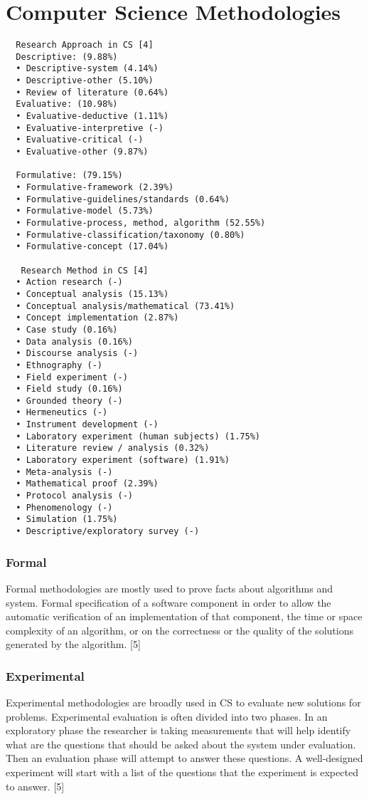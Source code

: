 \section{Computer Science Methodologies}

\begin{verbatim}
  Research Approach in CS [4]
  Descriptive: (9.88%)
  •	Descriptive-system (4.14%)
  •	Descriptive-other (5.10%)
  •	Review of literature (0.64%)
  Evaluative: (10.98%)
  •	Evaluative-deductive (1.11%)
  •	Evaluative-interpretive (-)
  •	Evaluative-critical (-)
  •	Evaluative-other (9.87%)

  Formulative: (79.15%)
  •	Formulative-framework (2.39%)
  •	Formulative-guidelines/standards (0.64%)
  •	Formulative-model (5.73%)
  •	Formulative-process, method, algorithm (52.55%)
  •	Formulative-classification/taxonomy (0.80%)
  •	Formulative-concept (17.04%)

   Research Method in CS [4]
  •	Action research (-)
  •	Conceptual analysis (15.13%)
  •	Conceptual analysis/mathematical (73.41%)
  •	Concept implementation (2.87%)
  •	Case study (0.16%)
  •	Data analysis (0.16%)
  •	Discourse analysis (-)
  •	Ethnography (-)
  •	Field experiment (-)
  •	Field study (0.16%)
  •	Grounded theory (-)
  •	Hermeneutics (-)
  •	Instrument development (-)
  •	Laboratory experiment (human subjects) (1.75%)
  •	Literature review / analysis (0.32%)
  •	Laboratory experiment (software) (1.91%)
  •	Meta-analysis (-)
  •	Mathematical proof (2.39%)
  •	Protocol analysis (-)
  •	Phenomenology (-)
  •	Simulation (1.75%)
  •	Descriptive/exploratory survey (-)
\end{verbatim}

\subsubsection{Formal}

Formal methodologies are mostly used to prove facts about algorithms and system. Formal specification of a software component in order to allow the automatic verification of an implementation of that component, the time or space complexity of an algorithm, or on the correctness or the quality of the solutions generated by the algorithm. [5]

\subsubsection{Experimental}

Experimental methodologies are broadly used in CS to evaluate new solutions for problems. Experimental evaluation is often divided into two phases. In an exploratory phase the researcher is taking measurements that will help identify what are the questions that should be asked about the system under evaluation. Then an evaluation phase will attempt to answer these questions. A well-designed experiment will start with a list of the questions that the experiment is expected to answer. [5]

